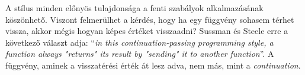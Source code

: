 A stílus minden előnyös tulajdonsága a fenti szabályok alkalmazásának köszönhető. Viszont felmerülhet a kérdés, hogy ha egy függvény sohasem térhet vissza, akkor mégis hogyan képes értéket visszaadni? Sussman és Steele \citeyear{Sussman1975} erre a következő választ adja: ``\textit{\textellipsis in this continuation-passing programming style, a function always "returns" its result by "sending" it to another function}''. A függvény, aminek a visszatérési érték át lesz adva, nem más, mint a \textit{continuation}.